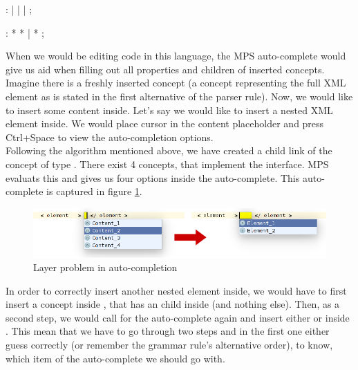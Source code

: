 \begin{antlr}
	    :   
           |   
           |   
           |   
           ;

	    :   \literal{<}  * \literal{>} * \literal{</}  \literal{>}
           |   \literal{<}  * \literal{/>}
           ;
\end{antlr}

When we would be editing code in this language, the MPS auto-complete would give us aid when filling out all properties and children of inserted concepts.
Imagine there is a freshly inserted  concept (a concept representing the full XML element as is stated in the first alternative of the  parser rule). 
Now, we would like to insert some content inside.
Let's say we would like to insert a nested XML element inside.
We would place cursor in the content placeholder and press Ctrl+Space to view the auto-completion options.
\\

Following the algorithm mentioned above, we have created a child link of the  concept of type .
There exist 4 concepts, that implement the  interface.
MPS evaluats this and gives us four options inside the auto-complete.
This auto-complete is captured in figure \ref{fig:layer_problem}.

\begin{figure}[h]
	\centering
	\includegraphics[width=\textwidth]{./img/layer_problem.png}
	\caption{Layer problem in auto-completion}
	\label{fig:layer_problem}
\end{figure}

In order to correctly insert another nested element inside, we would have to first insert a  concept inside , that has an  child inside (and nothing else).
Then, as a second step, we would call for the auto-complete again and insert either  or  inside .
This mean that we have to go through two steps and in the first one either guess correctly (or remember the grammar rule's alternative order), to know, which item of the auto-complete we should go with.
\\

